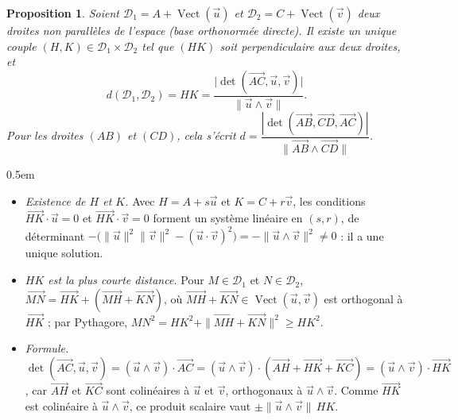 \documentclass[a4paper,11pt]{article}
\makeatletter
\numberwithin{equation}{section}
\numberwithin{figure}{section}
\numberwithin{table}{section}
\theoremstyle{enonce}
\newtheorem{proposition}[definition]{Proposition}
\theoremstyle{exemple}
\theoremstyle{remarque}
\renewcommand{\proofname}{Démonstration}
\renewenvironment{proof}[1][\proofname]{\par\pushQED{\qed}\normalfont
  \topsep0.5em\relax\trivlist\item[\hskip\labelsep\sffamily\itshape\color{Gris}#1.]\ignorespaces}
  {\popQED\endtrivlist\@endpefalse}
\newcommand{\vect}{\operatorname{Vect}}
\newcommand{\vv}[1]{\overrightarrow{#1}}
\newcommand{\ve}[1]{\vec{#1}}
\makeatother
\begin{document}
\begin{proposition}\label{prop:dist-droites}
Soient $\mathcal D_1=A+\vect(\ve u)$ et $\mathcal D_2=C+\vect(\ve v)$ deux droites non parallèles de l'espace (base
orthonormée directe). Il existe un unique couple $(H,K)\in\mathcal D_1\times\mathcal D_2$ tel que $(HK)$ soit
perpendiculaire aux deux droites, et
\[d(\mathcal D_1,\mathcal D_2)=HK=\frac{\big|\det(\vv{AC},\ve u,\ve v)\big|}{\|\ve u\wedge\ve v\|}.\]
Pour les droites $(AB)$ et $(CD)$, cela s'écrit $d=\dfrac{|\det(\vv{AB},\vv{CD},\vv{AC})|}{\|\vv{AB}\wedge\vv{CD}\|}$.
\end{proposition}

\begin{proof}
\begin{itemize}
\item \emph{Existence de $H$ et $K$.} Avec $H=A+s\ve u$ et $K=C+r\ve v$, les conditions $\vv{HK}\cdot\ve u=0$ et
      $\vv{HK}\cdot\ve v=0$ forment un système linéaire en $(s,r)$, de déterminant
      $-\big(\|\ve u\|^2\|\ve v\|^2-(\ve u\cdot\ve v)^2\big)=-\|\ve u\wedge\ve v\|^2\neq0$ : il a une unique solution.
\item \emph{$HK$ est la plus courte distance.} Pour $M\in\mathcal D_1$ et $N\in\mathcal D_2$,
      $\vv{MN}=\vv{HK}+(\vv{MH}+\vv{KN})$, où $\vv{MH}+\vv{KN}\in\vect(\ve u,\ve v)$ est orthogonal à $\vv{HK}$ ; par
      Pythagore, $MN^2=HK^2+\|\vv{MH}+\vv{KN}\|^2\geq HK^2$.
\item \emph{Formule.} $\det(\vv{AC},\ve u,\ve v)=(\ve u\wedge\ve v)\cdot\vv{AC}=(\ve u\wedge\ve v)\cdot(\vv{AH}+\vv{HK}+\vv{KC})
      =(\ve u\wedge\ve v)\cdot\vv{HK}$, car $\vv{AH}$ et $\vv{KC}$ sont colinéaires à $\ve u$ et $\ve v$, orthogonaux à
      $\ve u\wedge\ve v$. Comme $\vv{HK}$ est colinéaire à $\ve u\wedge\ve v$, ce produit scalaire vaut
      $\pm\|\ve u\wedge\ve v\|\,HK$.\qedhere
\end{itemize}
\end{proof}
\end{document}
